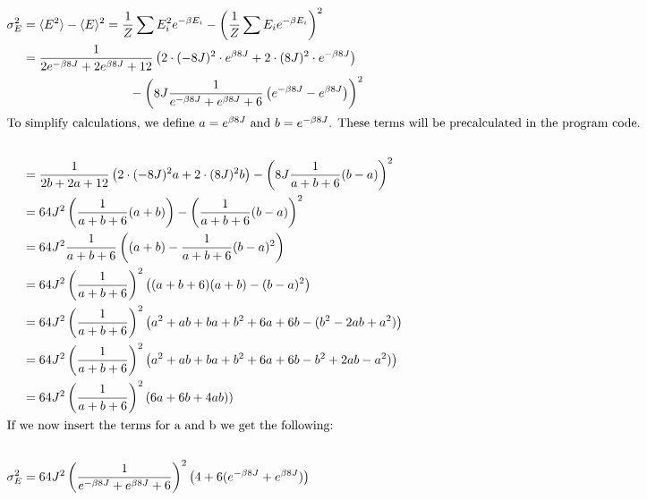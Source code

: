 \documentclass[../main.tex]{subfiles}
\begin{document}
    \begin{align*}
    \sigma^2_E &= \langle E^2 \rangle - \langle E \rangle ^2 = \frac{1}{Z}\sum E_i^2 e^{-\beta E_i} - \left( \frac{1}{Z} \sum E_i e^{-\beta E_i} \right)^2\\
    &= \frac{1}{2e^{-\beta 8J} + 2e^{\beta 8J} + 12} \left( 2 \cdot (-8J)^2 \cdot e^{\beta 8J} + 2 \cdot (8J)^2 \cdot e^{-\beta 8J} \right)\\
    &\hspace{3cm} - \left(8J \frac{1}{e^{-\beta 8J} + e^{\beta 8J} + 6}  \left(e^{-\beta8J} - e^{\beta 8J}\right)\right)^2\\
    \intertext{To simplify calculations, we define $a = e^{\beta 8J}$ and $b = e^{-\beta8J}$. These terms will be precalculated in the program code.}\\
    &= \frac{1}{2b + 2a + 12} \left(2 \cdot (-8J)^2 a + 2\cdot (8J)^2 b\right) - \left(8J \frac{1}{a + b + 6}(b-a)\right)^2\\
    &=64J^2 \left( \frac{1}{a + b + 6} (a + b) \right) - \left( \frac{1}{a+b+6} (b-a) \right)^2\\
    &=64J^2 \frac{1}{a+b+6}\left((a+b) - \frac{1}{a+b+6}(b-a)^2\right)\\
    &=64J^2 \left(\frac{1}{a+b+6}\right)^2 \left( (a+b+6)(a+b) - (b-a)^2 \right)\\
    &= 64J^2 \left(\frac{1}{a+b+6}\right)^2 \left( a^2 + ab + ba + b^2 + 6 a + 6 b -(b^2 - 2ab + a^2) \right)\\
    &= 64J^2 \left(\frac{1}{a+b+6}\right)^2 \left( a^2 + ab + ba + b^2 + 6 a + 6 b -b^2 + 2ab - a^2) \right)\\
    &= 64J^2 \left(\frac{1}{a+b+6}\right)^2 \left( 6a + 6b + 4ab ) \right)\\
    \intertext{If we now insert the terms for a and b we get the following:}\\
    \sigma^2_E &= 64J^2 \left(\frac{1}{e^{-\beta 8J} + e^{\beta 8J} + 6}\right)^2  \left(4 + 6(e^{-\beta 8J} + e^{\beta 8J}) \right)
    \end{align*}
\end{document}
